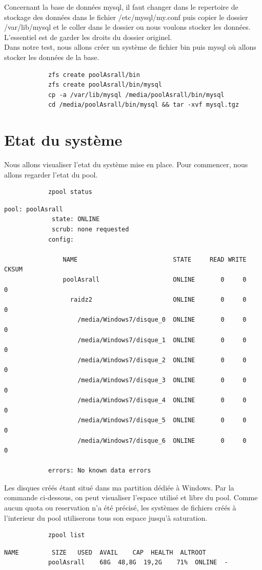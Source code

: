 \documentclass[a4paper]{report}
\begin{document}
	Concernant la base de données mysql, il faut changer dans le repertoire de stockage des données dans le fichier /etc/mysql/my.conf puis copier le dossier /var/lib/mysql et le coller dans le dossier ou nous voulons stocker les données. L'essentiel est de garder les droits du dossier originel. \\
Dans notre test, nous allons créer un système de fichier bin puis mysql où allons stocker les données de la base.
		\begin{lstlisting}
			zfs create poolAsrall/bin
			zfs create poolAsrall/bin/mysql
			cp -a /var/lib/mysql /media/poolAsrall/bin/mysql
			cd /media/poolAsrall/bin/mysql && tar -xvf mysql.tgz
		\end{lstlisting}
	\section{Etat du système}
	Nous allons visualiser l'etat du système mise en place. Pour commencer, nous allons regarder l'etat du pool.
		\begin{lstlisting}
			zpool status
		\end{lstlisting}
		\begin{lstlisting}[backgroundcolor=\color{yellow}]
			pool: poolAsrall
			 state: ONLINE
			 scrub: none requested
			config:

				NAME                          STATE     READ WRITE CKSUM
				poolAsrall                    ONLINE       0     0     0
				  raidz2                      ONLINE       0     0     0
				    /media/Windows7/disque_0  ONLINE       0     0     0
				    /media/Windows7/disque_1  ONLINE       0     0     0
				    /media/Windows7/disque_2  ONLINE       0     0     0
				    /media/Windows7/disque_3  ONLINE       0     0     0
				    /media/Windows7/disque_4  ONLINE       0     0     0
				    /media/Windows7/disque_5  ONLINE       0     0     0
				    /media/Windows7/disque_6  ONLINE       0     0     0

			errors: No known data errors
		\end{lstlisting}
		Les disques créés étant situé dans ma partition dédiée à Windows. Par la commande ci-dessous, on peut visualiser l'espace utilisé et libre du pool. Comme aucun quota ou reservation n'a été précisé, les systèmes de fichiers créés à l'interieur du pool utiliserons tous son espace jusqu'à saturation.
		\begin{lstlisting}
			zpool list
		\end{lstlisting}
		\begin{lstlisting}[backgroundcolor=\color{yellow}]
			NAME         SIZE   USED  AVAIL    CAP  HEALTH  ALTROOT
			poolAsrall    68G  48,8G  19,2G    71%  ONLINE  -
		\end{lstlisting}
\end{document}
